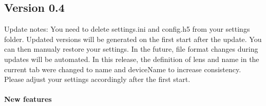 \documentclass[a4paper,11pt,DIV=13]{scrartcl}
\begin{document}
\subsection{Version 0.4}
Update notes: You need to delete settings.ini and config.h5 from your settings folder. Updated versions will be generated on the first start after the update. You can then manualy restore your settings. In the future, file format changes during updates will be automated. 
In this release, the definition of lens and name in the current tab were changed to name and deviceName to increase consistency. Please adjust your settings accordingly after the first start.

\paragraph{New features}
\end{document}
